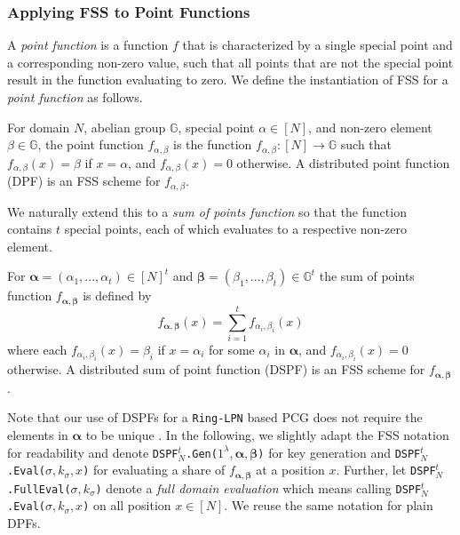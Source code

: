 \subsubsection{Applying FSS to Point Functions}
A \textit{point function} is a function \(f\) that is characterized by a single special point and a corresponding non-zero value, such that all points that are not the special point result in the function evaluating to zero. We define the instantiation of FSS for a \textit{point function} as follows.

\begin{definition}
For domain $N$, abelian group $\mathbb{G}$, special point $\alpha \in [N]$, and non-zero element $\beta \in \mathbb{G}$, the point function $f_{\alpha, \beta}$ is the function $f_{\alpha, \beta}: [N] \rightarrow \mathbb{G}$ such that $f_{\alpha, \beta}(x) = \beta$ if $x = \alpha$, and $f_{\alpha, \beta}(x) = 0$ otherwise. A distributed point function (DPF) is an FSS scheme for $f_{\alpha, \beta}$.
\end{definition}

We naturally extend this to a \textit{sum of points function} so that the function contains $t$ special points, each of which evaluates to a respective non-zero element.

\begin{definition}
\label{def:dspf}
For $\bm{\alpha} = (\alpha_1,...,\alpha_t) \in [N]^t$ and $\bm{\beta} = (\beta_1,...,\beta_t) \in \mathbb{G}^t$ the sum of points function $f_{\bm{\alpha}, \bm{\beta}}$ is defined by
$$
f_{\bm{\alpha}, \bm{\beta}}(x) = \sum_{i=1}^{t} f_{\alpha_i,\beta_i}(x)
$$
where each \( f_{\alpha_i,\beta_i}(x) = \beta_i \) if \( x = \alpha_i \) for some \( \alpha_i \) in \( \bm{\alpha} \), and \( f_{\alpha_i,\beta_i}(x) = 0 \) otherwise. A distributed sum of point function (DSPF) is an FSS scheme for $f_{\bm{\alpha}, \bm{\beta}}$.
\end{definition}

Note that our use of DSPFs for a \texttt{Ring-LPN} based PCG does not require the elements in $\bm{\alpha}$ to be unique \cite{boyle2020efficient}. In the following, we slightly adapt the FSS notation for readability and denote \texttt{DSPF$^t_N$.Gen($1^\lambda, \bm{\alpha}, \bm{\beta}$)} for key generation and \texttt{DSPF$^t_N$.Eval($\sigma, k_\sigma, x$)} for evaluating a share of $f_{\bm{\alpha}, \bm{\beta}}$ at a position $x$. Further, let \texttt{DSPF$^t_N$.FullEval($\sigma, k_\sigma$)} denote a \textit{full domain evaluation} which means calling \texttt{DSPF$^t_N$.Eval($\sigma, k_\sigma, x$)} on all position $x \in [N]$. We reuse the same notation for plain DPFs.

